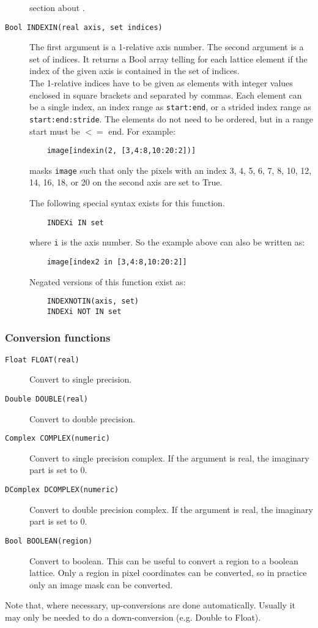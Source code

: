 \begin{description}
    section about .
  \item[ \texttt{Bool INDEXIN(real axis, set indices)}]
    The first argument is a 1-relative axis number. The second
    argument is a set of indices. It returns a Bool array telling for
    each lattice element if the index of the given axis is contained
    in the set of indices.
    \\The 1-relative indices have to be given as elements with integer
    values enclosed in square
    brackets and separated by commas. Each element can be a single
    index, an index range as \texttt{start:end}, or a strided index
    range as \texttt{start:end:stride}. The elements do not need to be
    ordered, but in a range start must be $<=$ end. For example:
    \begin{verbatim}
    image[indexin(2, [3,4:8,10:20:2])]
    \end{verbatim}
    masks \texttt{image} such that only the pixels with an index
    3, 4, 5, 6, 7, 8, 10, 12, 14, 16, 18, or 20 on the second axis
    are set to True.

    The following special syntax exists for this function.
    \begin{verbatim}
    INDEXi IN set
    \end{verbatim}
    where \texttt{i} is the axis number. So the example above can also
    be written as:
    \begin{verbatim}
    image[index2 in [3,4:8,10:20:2]]
    \end{verbatim}
    Negated versions of this function exist as:
    \begin{verbatim}
    INDEXNOTIN(axis, set)
    INDEXi NOT IN set
    \end{verbatim}
\end{description}

\subsubsection{Conversion functions}
\begin{description}
  \item[ \texttt{Float FLOAT(real)}]
    Convert to single precision.
  \item[ \texttt{Double DOUBLE(real)}]
    Convert to double precision.
  \item[ \texttt{Complex COMPLEX(numeric)}]
    Convert to single precision complex.
    If the argument is real, the imaginary part is set to 0.
  \item[ \texttt{DComplex DCOMPLEX(numeric)}]
    Convert to double precision complex.
    If the argument is real, the imaginary part is set to 0.
  \item[ \texttt{Bool BOOLEAN(region)}]
    Convert to boolean.
    This can be useful to convert a region to a boolean lattice.
    Only a region in pixel coordinates can be converted, so in
    practice only an image mask can be converted.
\end{description}
Note that, where necessary, up-conversions are done automatically.
Usually it may only be needed to do a down-conversion (e.g. Double to Float).

